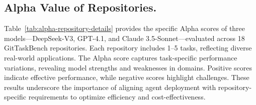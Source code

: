 \subsection*{Alpha Value of Repositories.}
\label{appendix:alpha score}
Table~\ref{tab:alpha-repository-details} provides the specific Alpha scores of three models---DeepSeek-V3, GPT-4.1, and Claude 3.5-Sonnet---evaluated across 18 GitTaskBench repositories. Each repository includes 1–5 tasks, reflecting diverse real-world applications. The Alpha score captures task-specific performance variations, revealing model strengths and weaknesses in domains. Positive scores indicate effective performance, while negative scores highlight challenges. These results underscore the importance of aligning agent deployment with repository-specific requirements to optimize efficiency and cost-effectiveness. 

\begin{table}[htbp]
\centering
\renewcommand{\arraystretch}{1.2}
\caption{Alpha Score of three models with OpenHands in GitTaskBench's different repositories.}
\label{tab:alpha-repository-details}
\end{table}


